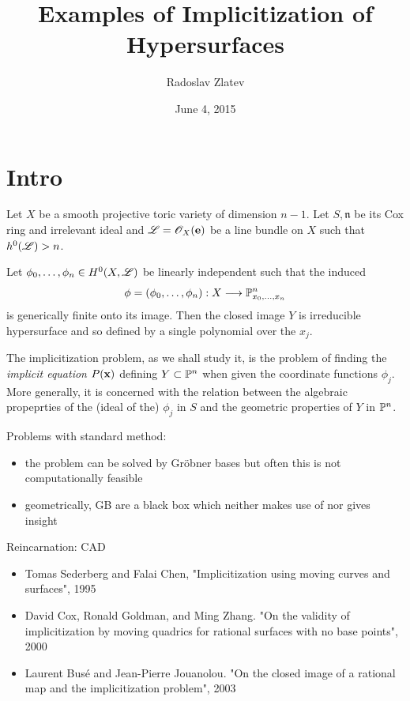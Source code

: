\documentclass[]{beamer}
\title{Examples of Implicitization of Hypersurfaces}
\author{Radoslav Zlatev}
\institute{Cornell University}
\date{June 4, 2015}
\begin{document}
\begin{frame}
\titlepage
\end{frame}



\section{Intro}

\begin{frame}
Let $X$ be a smooth projective toric variety of dimension $n-1$.
Let $S,\mathfrak{n}$ be its Cox ring and irrelevant ideal
and $\mathscr{L}=\mathscr{O}_X(\mathbf e)$ be a line bundle on $X$ such that $h^0(\mathscr{L})>n$.

Let $\phi_0,\ldots,\phi_n\in H^0(X,\mathscr{L})$ be linearly independent
such that the induced
\[
	\phi=(\phi_0,\ldots,\phi_n):X\longrightarrow\mathbb{P}^n_{x_0,\ldots,x_n}
\]
is generically finite onto its image.
Then the closed image $Y$ is irreducible hypersurface and so
defined by a single polynomial over the $x_j$.

\begin{definition}
	The implicitization problem, as we shall study it, is the problem of finding
	the {\em implicit equation} $P(\mathbf x)$ defining $Y\subset\mathbb{P}^n$ when given the coordinate
	functions $\phi_j$.
	More generally, it is concerned with the relation between the algebraic propeprties
	of the (ideal of the) $\phi_j$ in $S$ and the geometric properties of $Y$ in $\mathbb{P}^n$.
\end{definition}
\end{frame}

\begin{frame}
	Problems with standard method:
	\begin{itemize}
	\item the problem can be solved by Gr\"obner bases but often this is not computationally feasible
	\item geometrically, GB are a black box which neither makes use of nor gives insight
	\end{itemize}
	
	Reincarnation: CAD
	\begin{itemize}
	\item Tomas Sederberg and Falai Chen, "Implicitization using moving curves and surfaces", 1995
	\item David Cox, Ronald Goldman, and Ming Zhang. "On the validity of implicitization by moving quadrics for rational surfaces with no base points", 2000
	\item Laurent Bus\'e and Jean-Pierre Jouanolou. "On the closed image of a rational map and the implicitization problem", 2003
	\end{itemize}
\end{frame}
\end{document}
